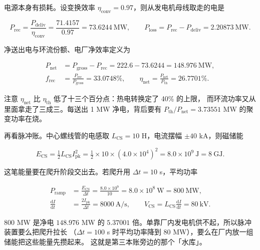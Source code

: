 电源本身有损耗。设变换效率 $\eta_\mathrm{conv}=0.97$，则从发电机母线取走的电是

\begin{equation}
P_\mathrm{rec}=\frac{P_\mathrm{deliv}}{\eta_\mathrm{conv}}
=\frac{71.4157}{0.97}=73.6244\ \mathrm{MW},
\qquad
P_\mathrm{loss}=P_\mathrm{rec}-P_\mathrm{deliv}=2.20873\ \mathrm{MW}.
\label{eq:app-ar-recirc}
\end{equation}

净送出电与环流份额、电厂净效率定义为

\begin{equation}
\begin{aligned}
P_\mathrm{net}&=P_\mathrm{gross}-P_\mathrm{rec}=222.6-73.6244=148.976\ \mathrm{MW},\\
f_\mathrm{rec}&=\frac{P_\mathrm{rec}}{P_\mathrm{gross}}=33.0748\%,
\qquad
\eta_\mathrm{net}=\frac{P_\mathrm{net}}{P_\mathrm{th}}=26.7701\%.
\end{aligned}
\label{eq:app-ar-net}
\end{equation}

注意 $\eta_\mathrm{net}$ 比 $\eta_\mathrm{th}$ 低了十三个百分点：热电转换定了 40\% 的上限，
而环流功率又从里面拿走了三成三。每送出 1 MW 净电，背后要有
$P_\mathrm{th}/P_\mathrm{net}=3.73551$ MW 的聚变功率在烧。

再看脉冲账。中心螺线管的电感取 $L_\mathrm{CS}=10$ H，电流摆幅 $\pm40$ kA，则磁储能

\begin{equation}
E_\mathrm{CS}=\tfrac12 L_\mathrm{CS}I_\mathrm{pk}^2
=\tfrac12\times10\times(4.0\times10^{4})^2=8.0\times10^{9}\ \mathrm{J}=8\ \mathrm{GJ}.
\label{eq:app-ar-cs}
\end{equation}

这笔能量要在爬升阶段交出去。若爬升用 $\Delta t=10$ s，平均功率

\begin{equation}
\begin{aligned}
P_\mathrm{ramp}&=\frac{E_\mathrm{CS}}{\Delta t}=\frac{8.0\times10^{9}}{10}
=8.0\times10^{8}\ \mathrm{W}=800\ \mathrm{MW},\\
\frac{\mathrm{d}I}{\mathrm{d}t}&=\frac{2I_\mathrm{pk}}{\Delta t}=8000\ \mathrm{A/s},
\qquad
V_\mathrm{CS}=L_\mathrm{CS}\frac{\mathrm{d}I}{\mathrm{d}t}=80\ \mathrm{kV}.
\end{aligned}
\label{eq:app-ar-ramp}
\end{equation}

$800$ MW 是净电 $148.976$ MW 的 $5.37001$ 倍。单靠厂内发电机供不起，所以脉冲装置要么把爬升拉长
（$\Delta t=100$ s 时平均功率降到 $80$ MW），要么在厂内放一组储能把这些能量先攒起来。
这就是第三本账旁边的那个「水库」。

